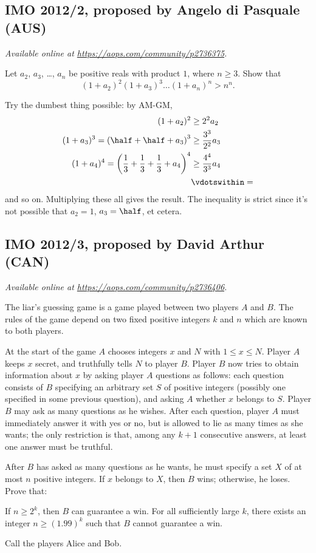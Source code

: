 \documentclass[11pt]{scrartcl}
\begin{document}
\subsection{IMO 2012/2, proposed by Angelo di Pasquale (AUS)}
\textsl{Available online at \url{https://aops.com/community/p2736375}.}
\begin{mdframed}[style=mdpurplebox,frametitle={Problem statement}]
Let $a_2$, $a_3$, \dots, $a_n$ be positive reals with product $1$,
where $n \ge 3$.
Show that
\[ (1+a_2)^2 (1+a_3)^3 \dots (1+a_n)^n > n^n. \]
\end{mdframed}
Try the dumbest thing possible: by AM-GM,
\begin{align*}
  (1 + a_2)^2 &\ge 2^2 a_2 \\
  (1 + a_3)^3 = \left( \half + \half + a_3 \right)^3 &\ge \frac{3^3}{2^2} a_3 \\
  (1 + a_4)^4 = \left( \frac13 + \frac13 + \frac13 + a_4 \right)^4
    &\ge \frac{4^4}{3^3} a_4 \\
  &\vdotswithin=
\end{align*}
and so on.
Multiplying these all gives the result.
The inequality is strict since it's not possible
that $a_2 = 1$, $a_3 = \half$, et cetera.
\pagebreak

\subsection{IMO 2012/3, proposed by David Arthur (CAN)}
\textsl{Available online at \url{https://aops.com/community/p2736406}.}
\begin{mdframed}[style=mdpurplebox,frametitle={Problem statement}]
The liar's guessing game is a game played between two players $A$ and $B$.
The rules of the game depend on two fixed positive integers $k$ and $n$
which are known to both players.

At the start of the game $A$
chooses integers $x$ and $N$ with $1 \le x \le N$.
Player $A$ keeps $x$ secret, and truthfully tells $N$ to player $B$.
Player $B$ now tries to obtain information about $x$
by asking player $A$ questions as follows:
each question consists of $B$ specifying an arbitrary set $S$
of positive integers (possibly one specified in some previous question),
and asking $A$ whether $x$ belongs to $S$.
Player $B$ may ask as many questions as he wishes.
After each question, player $A$ must immediately answer
it with yes or no, but is allowed to lie as many times as she wants;
the only restriction is that, among any $k+1$ consecutive answers,
at least one answer must be truthful.

After $B$ has asked as many questions as he wants,
he must specify a set $X$ of at most $n$ positive integers.
If $x$ belongs to $X$, then $B$ wins;
otherwise, he loses.
Prove that:

\begin{enumerate}[(a)]
  \ii If $n \ge 2^k$, then $B$ can guarantee a win.
  \ii For all sufficiently large $k$,
  there exists an integer $n \ge (1.99)^k$
  such that $B$ cannot guarantee a win.
\end{enumerate}
\end{mdframed}
Call the players Alice and Bob.
\end{document}
